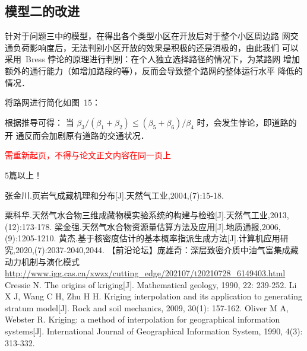 \documentclass[12pt,a4paper]{nmmcm}
\begin{document}
\subsection{模型二的改进}

针对于问题三中的模型，在得出各个类型小区在开放后对于整个小区周边路
网交通负荷影响度后，无法判别小区开放的效果是积极的还是消极的，由此我们
可以采用~Bress 悖论的原理进行判别：在个人独立选择路径的情况下，为某路网
增加额外的通行能力（如增加路段的等），反而会导致整个路网的整体运行水平
降低的情况．

将路网进行简化如图~15：

根据推导可得： 当 $\beta_{3}/\left(\beta_{1}+\beta_{2}\right) \leq\left(\beta_{5}+\beta_{6}\right)/\beta_{4}$ 时，会发生悖论，即道路的开
通反而会加剧原有道路的交通状况．

\textcolor{red}{需重新起页，不得与论文正文内容在同一页上}

\begin{rmk}
  5篇以上！
\end{rmk}

\newpage

\begin{thebibliography}{99}
   张金川.页岩气成藏机理和分布[J].天然气工业,2004,(7):15-18.

   粟科华.天然气水合物三维成藏物模实验系统的构建与检验[J].天然气工业,2013,(12):173-178.
   梁金强.天然气水合物资源量估算方法及应用[J].地质通报,2006,(9):1205-1210.
   黄杰.基于核密度估计的基本概率指派生成方法[J].计算机应用研究,2020,(7):2037-2040,2044.
   【前沿论坛】庞雄奇：深层致密介质中油气富集成藏动力机制与演化模式
  \url{http://www.igg.cas.cn/xwzx/cutting_edge/202107/t20210728_6149403.html}
  Cressie N. The origins of kriging[J]. Mathematical geology, 1990, 22: 239-252.
  Li X J, Wang C H, Zhu H H. Kriging interpolation and its application to generating stratum model[J]. Rock and soil mechanics, 2009, 30(1): 157-162.
  Oliver M A, Webster R. Kriging: a method of interpolation for geographical information systems[J]. International Journal of Geographical Information System, 1990, 4(3): 313-332.

\end{thebibliography}
\newpage
\end{document}
